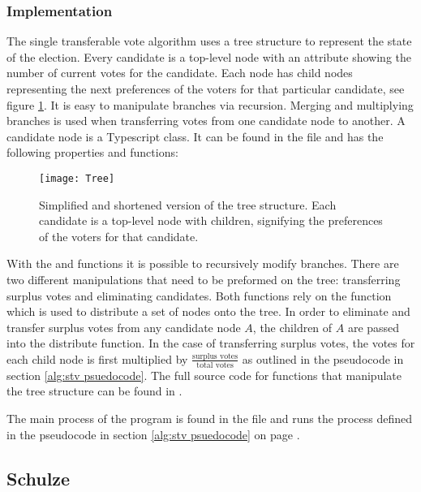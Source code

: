 \documentclass[12pt]{article}
\begin{document}
\subsubsection{Implementation}
The single transferable vote algorithm uses a tree structure to represent the state of the election. Every candidate is a top-level node with an attribute showing the number of current votes for the candidate. Each node has child nodes representing the next preferences of the voters for that particular candidate, see figure \ref{fig:tree structure}. It is easy to manipulate branches via recursion. Merging and multiplying branches is used when transferring votes from one candidate node to another. A candidate node is a Typescript class. It can be found in the  file and has the following properties and functions:
\begin{figure}
	\centering
	\texttt{[image: Tree]}
	\caption{Simplified and shortened version of the tree structure. Each candidate is a top-level node with children, signifying the preferences of the voters for that candidate.}
	\label{fig:tree structure}
\end{figure}
With the  and  functions it is possible to recursively modify branches. There are two different manipulations that need to be preformed on the tree: transferring surplus votes and eliminating candidates. Both functions rely on the  function which is used to distribute a set of nodes onto the tree.
In order to eliminate and transfer surplus votes from any candidate node $A$, the children of $A$ are passed into the distribute function. In the case of transferring surplus votes, the votes for each child node is first multiplied by $\frac{\text{surplus votes}}{\text{total votes}}$ as outlined in the pseudocode in section \ref{alg:stv psuedocode}. The full source code for functions that manipulate the tree structure can be found in .

The main process of the program is found in the  file and runs the process defined in the pseudocode in section \ref{alg:stv psuedocode} on page \pageref{alg:stv psuedocode}.

\subsection{Schulze}
\end{document}
